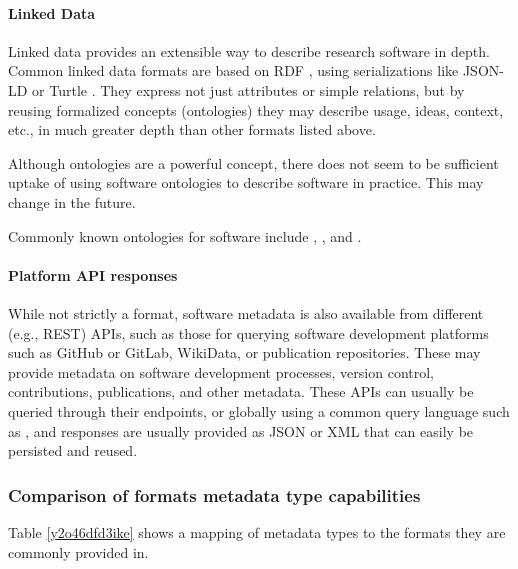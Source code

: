 \documentclass{article}
\begin{document}
\paragraph{Linked Data}\label{par:metadata-formats-linked-data}
Linked data provides an extensible way to describe research software in depth. Common linked data formats are based on RDF \cite{11045035/RZXJXX75}, using serializations like JSON-LD \cite{11045035/DQRH6UQP} or Turtle \cite{11045035/F3ARKWX4}. They express not just attributes or simple relations, but by reusing formalized concepts (ontologies) they may describe usage, ideas, context, etc., in much greater depth than other formats listed above.

Although ontologies are a powerful concept, there does not seem to be sufficient uptake of using software ontologies to describe software in practice. This may change in the future.

Commonly known ontologies for software include \cite{11045035/TVVPYY5L}, \cite{11045035/5JK345NF}, \cite{11045035/A8V7DJ4R} and \cite{11045035/YPMVLAM4}.


\paragraph{Platform API responses}\label{par:metadata-formats-apis}
While not strictly a format, software metadata is also available from different (e.g., REST) APIs, such as those for querying software development platforms such as GitHub or GitLab, WikiData, or publication repositories. These may provide metadata on software development processes, version control, contributions, publications, and other metadata. These APIs can usually be queried through their endpoints, or globally using a common query language such as \cite{138880/D5YC8HI5}, and responses are usually provided as JSON or XML that can easily be persisted and reused.



\subsubsection{Comparison of formats metadata type capabilities}\label{subsubsec:comparision-metadata}
Table \ref{y2o46dfd3ike} shows a mapping of metadata types to the formats they are commonly provided in.
\end{document}
